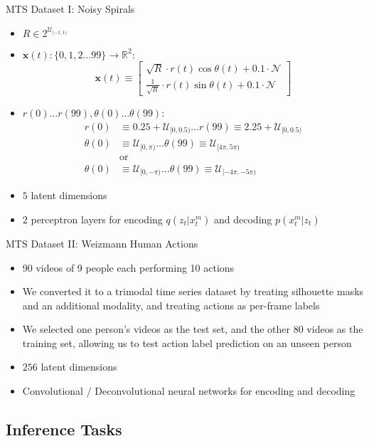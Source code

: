 \documentclass{beamer}
\begin{document}
\begin{frame}{MTS Dataset I: Noisy Spirals}
\begin{itemize}
\item $R\in2^{\mathcal{U}_{[-1,1)}}$
\item $\mathbf{x}(t):\{0,1,2\dots99\}\to\mathbb{R}^2$:\[
\mathbf{x}(t)\equiv\begin{bmatrix}
\sqrt{R}\cdot r(t)\cos\theta(t)+0.1\cdot\mathcal{N}\\
\frac{1}{\sqrt{R}}\cdot r(t)\sin\theta(t)+0.1\cdot\mathcal{N}
\end{bmatrix}
\]
\item $r(0)\dots r(99),\theta(0)\dots\theta(99)$:\[
\begin{split}
r(0)&\equiv0.25+\mathcal{U}_{[0,0.5)}\dots r(99)\equiv2.25+\mathcal{U}_{[0,0.5)}\\
\theta(0)&\equiv\mathcal{U}_{[0,\pi)}\dots\theta(99)\equiv\mathcal{U}_{[4\pi,5\pi)}\\
&\text{or}\\
\theta(0)&\equiv\mathcal{U}_{[0,-\pi)}\dots\theta(99)\equiv\mathcal{U}_{[-4\pi,-5\pi)}
\end{split}
\]
\item $5$ latent dimensions
\item $2$ perceptron layers for encoding $q(z_t|x_t^m)$ and decoding $p(x_t^m|z_t)$
\end{itemize}
\end{frame}

\begin{frame}{MTS Dataset II: Weizmann Human Actions}
\begin{itemize}
\item 90 videos of 9 people each performing 10 actions
\item We converted it to a trimodal time series dataset by treating silhouette masks and an additional modality, and treating actions as per-frame labels
\item We selected one person's videos as the test set, and the other 80 videos as the training set, allowing us to test action label prediction on an unseen person
\item $256$ latent dimensions
\item Convolutional / Deconvolutional neural networks for encoding and decoding
\end{itemize}
\end{frame}


\subsection{Inference Tasks}
\end{document}
